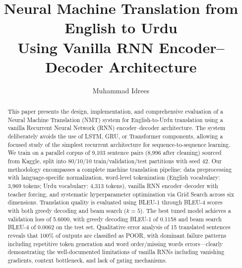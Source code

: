 \documentclass[runningheads]{llncs}
\begin{document}
\title{Neural Machine Translation from English to Urdu\\Using Vanilla RNN Encoder--Decoder Architecture}

\author{Muhammad Idrees}


\maketitle

\begin{abstract}
This paper presents the design, implementation, and comprehensive evaluation of a Neural Machine Translation (NMT) system for English-to-Urdu translation using a vanilla Recurrent Neural Network (RNN) encoder--decoder architecture. The system deliberately avoids the use of LSTM, GRU, or Transformer components, allowing a focused study of the simplest recurrent architecture for sequence-to-sequence learning. We train on a parallel corpus of 9,103 sentence pairs (8,996 after cleaning) sourced from Kaggle, split into 80/10/10 train/validation/test partitions with seed 42. Our methodology encompasses a complete machine translation pipeline: data preprocessing with language-specific normalization, word-level tokenization (English vocabulary: 3,969 tokens; Urdu vocabulary: 4,313 tokens), vanilla RNN encoder--decoder with teacher forcing, and systematic hyperparameter optimization via Grid Search across six dimensions. Translation quality is evaluated using BLEU-1 through BLEU-4 scores with both greedy decoding and beam search ($k{=}5$). The best tuned model achieves a validation loss of 5.6000, with greedy decoding BLEU-1 of 0.1158 and beam search BLEU-4 of 0.0062 on the test set. Qualitative error analysis of 15 translated sentences reveals that 100\% of outputs are classified as POOR, with dominant failure patterns including repetitive token generation and word order/missing words errors---clearly demonstrating the well-documented limitations of vanilla RNNs including vanishing gradients, context bottleneck, and lack of gating mechanisms.

\end{abstract}
\end{document}
